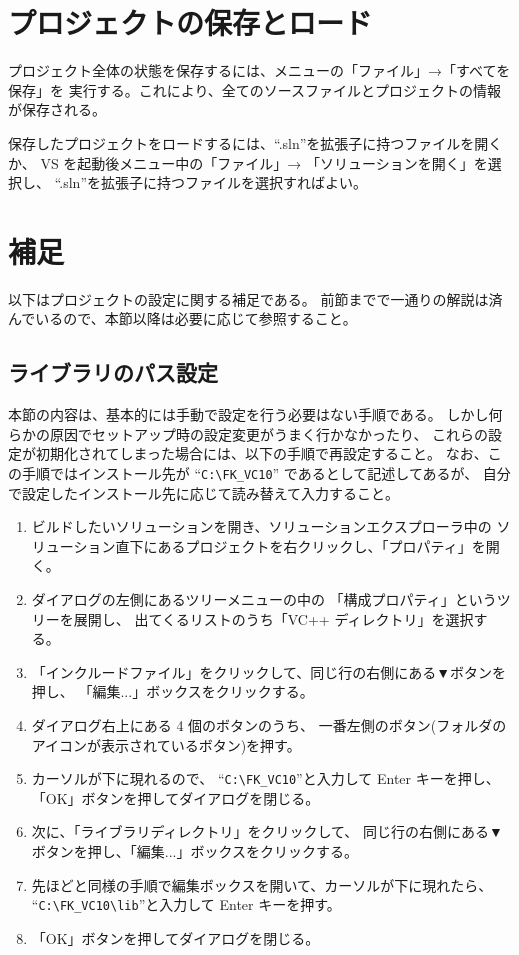 \documentclass[a4j]{jarticle}
\begin{document}
\section{プロジェクトの保存とロード}
プロジェクト全体の状態を保存するには、メニューの「ファイル」→「すべてを保存」を
実行する。これにより、全てのソースファイルとプロジェクトの情報が保存される。

保存したプロジェクトをロードするには、``.sln''を拡張子に持つファイルを開くか、
VS を起動後メニュー中の「ファイル」→ 「ソリューションを開く」を選択し、
``.sln''を拡張子に持つファイルを選択すればよい。

\appendix

\section{補足}
以下はプロジェクトの設定に関する補足である。
前節までで一通りの解説は済んでいるので、本節以降は必要に応じて参照すること。

\subsection{ライブラリのパス設定}
本節の内容は、基本的には手動で設定を行う必要はない手順である。
しかし何らかの原因でセットアップ時の設定変更がうまく行かなかったり、
これらの設定が初期化されてしまった場合には、以下の手順で再設定すること。
なお、この手順ではインストール先が ``\verb+C:\FK_VC10+'' であるとして記述してあるが、
自分で設定したインストール先に応じて読み替えて入力すること。

\begin{enumerate}
 \item ビルドしたいソリューションを開き、ソリューションエクスプローラ中の
 ソリューション直下にあるプロジェクトを右クリックし、「プロパティ」を開く。
 \item ダイアログの左側にあるツリーメニューの中の
	「構成プロパティ」というツリーを展開し、
	出てくるリストのうち「VC++ ディレクトリ」を選択する。
 \item 「インクルードファイル」をクリックして、同じ行の右側にある▼ボタンを押し、
 	「編集...」ボックスをクリックする。
 \item ダイアログ右上にある	4 個のボタンのうち、
	一番左側のボタン(フォルダのアイコンが表示されているボタン)を押す。
 \item カーソルが下に現れるので、
	``\verb+C:\FK_VC10+''と入力して Enter キーを押し、
	「OK」ボタンを押してダイアログを閉じる。
 \item 次に、「ライブラリディレクトリ」をクリックして、
 	同じ行の右側にある▼ボタンを押し、「編集...」ボックスをクリックする。
 \item 先ほどと同様の手順で編集ボックスを開いて、カーソルが下に現れたら、
	``\verb+C:\FK_VC10\lib+''と入力して Enter キーを押す。
 \item 「OK」ボタンを押してダイアログを閉じる。
\end{enumerate}
\end{document}
